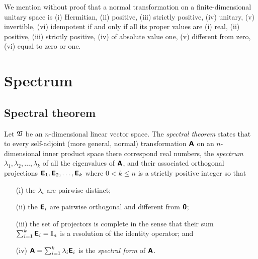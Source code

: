 We mention without proof that
a normal transformation on a finite-dimensional unitary space is
(i) Hermitian,
(ii) positive,
(iii) strictly positive,
(iv) unitary,
(v) invertible,
(vi) idempotent
if and only if all its proper values are
(i) real,
(ii) positive,
(iii) strictly positive,
(iv) of absolute value one,
(v) different from zero,
(vi) equal to zero or one.

\section{Spectrum}

\subsection{Spectral theorem}
\label{2012-m-ch-Spectraltheorem}

Let $\frak V$ be an $n$-dimensional linear vector space.
The {\em spectral theorem} states
that to every self-adjoint (more general, normal) transformation $ \textsf{\textbf{A}}$
on an $n$-dimensional inner product space there correspond real numbers, the {\em spectrum}
$
\lambda_1,
\lambda_2, \ldots ,
\lambda_k
$
of all the eigenvalues of   $ \textsf{\textbf{A}}$,
and their associated  orthogonal projections
$
\textsf{\textbf{E}}_1,
\textsf{\textbf{E}}_2, \ldots ,
\textsf{\textbf{E}}_k
$
where $0<k\le n$ is a strictly positive integer so that
\begin{itemize}
\item[(i)]
the $\lambda_i$ are pairwise distinct;
\item[(ii)]
the $\textsf{\textbf{E}}_i$ are pairwise orthogonal and different from $\textsf{\textbf{0}}$;
\item[(iii)]
the set of projectors is complete in the sense that their
sum $\sum_{i=1}^k \textsf{\textbf{E}}_i={\Bbb I}_n$
is a resolution of the identity operator; and
\item[(iv)]
$
\textsf{\textbf{A}}=\sum_{i=1}^k \lambda_i\textsf{\textbf{E}}_i
$
is the {\em spectral form} of $\textsf{\textbf{A}}$.
\end{itemize}

